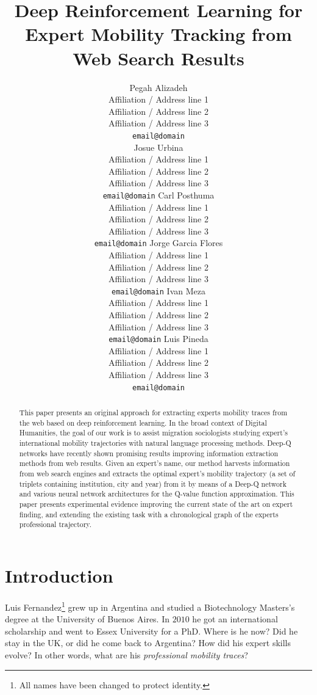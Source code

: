 \documentclass[11pt,a4paper]{article}
\title{Deep Reinforcement Learning for Expert Mobility Tracking from Web Search Results}
\author{Pegah Alizadeh \\
  Affiliation / Address line 1 \\
  Affiliation / Address line 2 \\
  Affiliation / Address line 3 \\
  {\tt email@domain} \\\And
  Josue Urbina \\
  Affiliation / Address line 1 \\
  Affiliation / Address line 2 \\
  Affiliation / Address line 3 \\
  {\tt email@domain}
  Carl Posthuma \\
  Affiliation / Address line 1 \\
  Affiliation / Address line 2 \\
  Affiliation / Address line 3 \\
  {\tt email@domain} 
  Jorge Garcia Flores \\
  Affiliation / Address line 1 \\
  Affiliation / Address line 2 \\
  Affiliation / Address line 3 \\
  {\tt email@domain} 
  Ivan Meza \\
  Affiliation / Address line 1 \\
  Affiliation / Address line 2 \\
  Affiliation / Address line 3 \\
  {\tt email@domain} 
  Luis Pineda \\
  Affiliation / Address line 1 \\
  Affiliation / Address line 2 \\
  Affiliation / Address line 3 \\
  {\tt email@domain}
  \\}
\date{}
\begin{document}
\maketitle
\begin{abstract}

  This paper presents an original approach for extracting experts mobility traces from the web based on deep reinforcement learning. In the broad context of Digital Humanities, the goal of our work is to assist migration sociologists studying expert's international mobility trajectories with natural language processing methods. Deep-Q networks have recently shown promising results improving information extraction methods from web results. Given an expert's name, our method harvests information from web search engines and extracts the optimal expert's mobility trajectory (a set of triplets containing institution, city and year) from it by means of a Deep-Q network and various neural network architectures for the Q-value function approximation. This paper presents experimental evidence improving the current state of the art on expert finding, and extending the existing task with a chronological graph of the experts professional trajectory. 

\end{abstract}

\section{Introduction}
Luis Fernandez\footnote{All names have been changed to protect identity.} grew up in Argentina and studied a Biotechnology Masters's degree at the University of Buenos Aires. In $2010$ he got an international scholarship and went to Essex University for a PhD. Where is he now? Did he stay in the UK, or did he come back to Argentina? How did his expert skills evolve? In other words, what are his \textit{professional mobility traces}?
\end{document}
